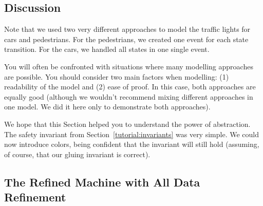 \subsection{Discussion}

Note that we used two very different approaches to model the traffic lights for cars and pedestrians.  For the pedestrians, we created one event for each state transition.  For the cars, we handled all states in one single event.

You will often be confronted with situations where many modelling approaches are possible.  You should consider two main factors when modelling: (1) readability of the model and (2) ease of proof.  In this case, both approaches are equally good (although we wouldn't recommend mixing different approaches in one model.  We did it here only to demonstrate both approaches).

We hope that this Section helped you to understand the power of abstraction.  The safety invariant from Section~\ref{tutorial:invariants} was very simple.  We could now introduce colors, being confident that the invariant will still hold (assuming, of course, that our gluing invariant is correct).

\subsection{The Refined Machine with All Data Refinement}

